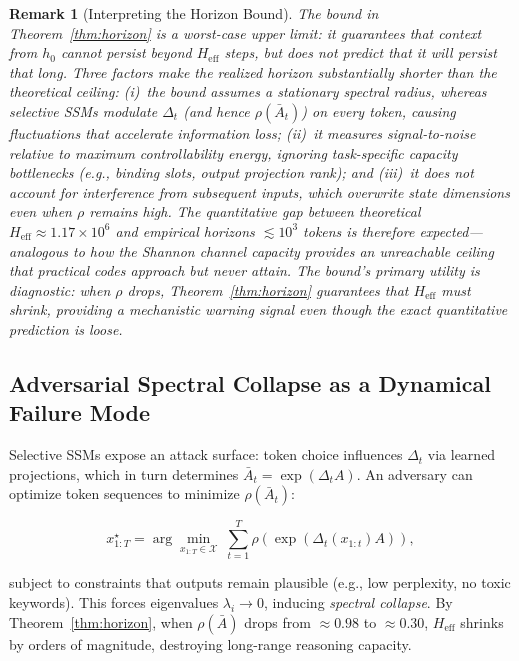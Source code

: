 \documentclass[10pt,twocolumn]{article}
\newtheorem{remark}{Remark}
\begin{document}
\begin{remark}[Interpreting the Horizon Bound]
\label{rem:horizon_interpretation}
The bound in Theorem~\ref{thm:horizon} is a \emph{worst-case upper limit}: it guarantees that context from $h_0$ \emph{cannot} persist beyond $H_{\text{eff}}$ steps, but does not predict that it \emph{will} persist that long. Three factors make the realized horizon substantially shorter than the theoretical ceiling: (i)~the bound assumes a \emph{stationary} spectral radius, whereas selective SSMs modulate $\Delta_t$ (and hence $\rho(\bar{A}_t)$) on every token, causing fluctuations that accelerate information loss; (ii)~it measures signal-to-noise relative to maximum controllability energy, ignoring task-specific capacity bottlenecks (e.g., binding slots, output projection rank); and (iii)~it does not account for interference from subsequent inputs, which overwrite state dimensions even when $\rho$ remains high. The quantitative gap between theoretical $H_{\text{eff}} \approx 1.17 \times 10^6$ and empirical horizons $\lesssim 10^3$ tokens is therefore \emph{expected}---analogous to how the Shannon channel capacity provides an unreachable ceiling that practical codes approach but never attain. The bound's primary utility is \emph{diagnostic}: when $\rho$ drops, Theorem~\ref{thm:horizon} guarantees that $H_{\text{eff}}$ \emph{must} shrink, providing a mechanistic warning signal even though the exact quantitative prediction is loose.
\end{remark}

\subsection{Adversarial Spectral Collapse as a Dynamical Failure Mode}

Selective SSMs expose an attack surface: token choice influences $\Delta_t$ via learned projections, which in turn determines $\bar{A}_t = \exp(\Delta_t A)$. An adversary can optimize token sequences to minimize $\rho(\bar{A}_t)$:

\begin{equation}
x^\star_{1:T} = \arg\min_{x_{1:T} \in \mathcal{X}} \; \sum_{t=1}^{T} \rho\!\left(\exp(\Delta_t(x_{1:t}) A)\right),
\label{eq:attack_objective}
\end{equation}

subject to constraints that outputs remain plausible (e.g., low perplexity, no toxic keywords). This forces eigenvalues $\lambda_i \to 0$, inducing \emph{spectral collapse}. By Theorem~\ref{thm:horizon}, when $\rho(\bar{A})$ drops from $\approx 0.98$ to $\approx 0.30$, $H_{\text{eff}}$ shrinks by orders of magnitude, destroying long-range reasoning capacity.
\end{document}
